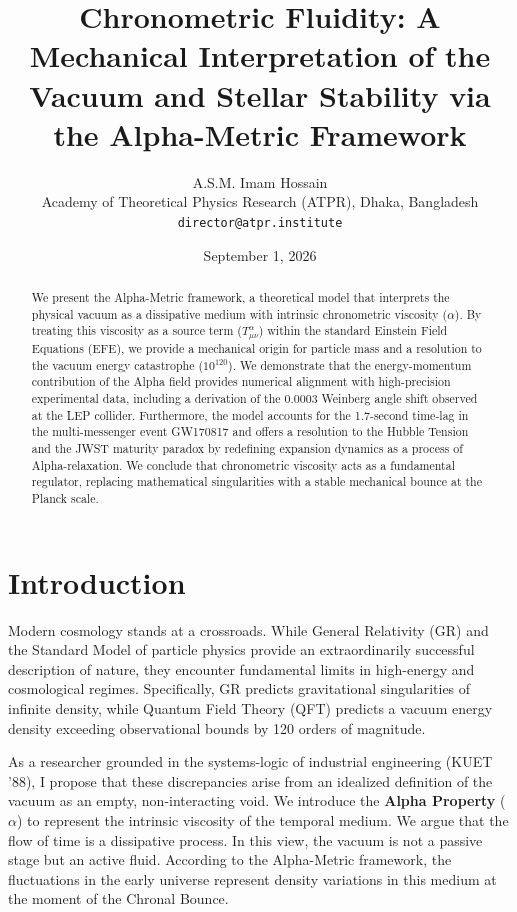 \documentclass[12pt,a4paper]{article}
\title{\textbf{Chronometric Fluidity: A Mechanical Interpretation of the Vacuum and Stellar Stability via the Alpha-Metric Framework}}
\author{A.S.M. Imam Hossain \\ 
\small Academy of Theoretical Physics Research (ATPR), Dhaka, Bangladesh \\
\small \texttt{director@atpr.institute} }
\date{\small September 1, 2026}
\begin{document}
\maketitle

\begin{abstract}
We present the Alpha-Metric framework, a theoretical model that interprets the physical vacuum as a dissipative medium with intrinsic chronometric viscosity ($\alpha$). By treating this viscosity as a source term ($T_{\mu\nu}^{\alpha}$) within the standard Einstein Field Equations (EFE), we provide a mechanical origin for particle mass and a resolution to the vacuum energy catastrophe ($10^{120}$). We demonstrate that the energy-momentum contribution of the Alpha field provides numerical alignment with high-precision experimental data, including a derivation of the 0.0003 Weinberg angle shift observed at the LEP collider. Furthermore, the model accounts for the 1.7-second time-lag in the multi-messenger event GW170817 and offers a resolution to the Hubble Tension and the JWST maturity paradox by redefining expansion dynamics as a process of Alpha-relaxation. We conclude that chronometric viscosity acts as a fundamental regulator, replacing mathematical singularities with a stable mechanical bounce at the Planck scale.
\end{abstract}


\section{Introduction}
Modern cosmology stands at a crossroads. While General Relativity (GR) and the Standard Model of particle physics provide an extraordinarily successful description of nature, they encounter fundamental limits in high-energy and cosmological regimes. Specifically, GR predicts gravitational singularities of infinite density, while Quantum Field Theory (QFT) predicts a vacuum energy density exceeding observational bounds by 120 orders of magnitude. 

As a researcher grounded in the systems-logic of industrial engineering (KUET '88), I propose that these discrepancies arise from an idealized definition of the vacuum as an empty, non-interacting void. We introduce the \textbf{Alpha Property} ($\alpha$) to represent the intrinsic viscosity of the temporal medium. We argue that the flow of time is a dissipative process. In this view, the vacuum is not a passive stage but an active fluid. According to the Alpha-Metric framework, the fluctuations in the early universe represent density variations in this medium at the moment of the Chronal Bounce.
\end{document}
